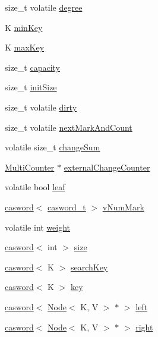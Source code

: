 \begin{DoxyCompactItemize}
\begin{tabbing}
\end{tabbing}\item 
size\+\_\+t volatile \hyperlink{classNode_a2dd213b9ec29f7a388aecbf3745028ab}{degree}
\item 
K \hyperlink{classNode_af389a346229e7fc7a55c07ce18816c72}{min\+Key}
\item 
K \hyperlink{classNode_a952ab64410cb2844499a2cf856848f14}{max\+Key}
\item 
size\+\_\+t \hyperlink{classNode_a017fd2017e14882deaf39b960d740b7e}{capacity}
\item 
size\+\_\+t \hyperlink{classNode_aba5197eb2b00bef6628dcf30056a2d92}{init\+Size}
\item 
size\+\_\+t volatile \hyperlink{classNode_af8f8003d96ba90f4f5acd5c003386b08}{dirty}
\item 
size\+\_\+t volatile \hyperlink{classNode_a8a7ef9d231138ce3458e3b360c0cee57}{next\+Mark\+And\+Count}
\item 
volatile size\+\_\+t \hyperlink{classNode_af94bd72d91f93e528c76778a60f5312e}{change\+Sum}
\item 
\hyperlink{classMultiCounter}{Multi\+Counter} $\ast$ \hyperlink{classNode_a5de4abf9942c16e6d8938e78a69efb31}{external\+Change\+Counter}
\item 
volatile bool \hyperlink{classNode_a1897c0740278b98f1066d2f62f29e6f4}{leaf}
\item 
\hyperlink{structcasword}{casword}$<$ \hyperlink{rq__unsafe_8h_ad45142aaf2ff20a036dc6242b8483e9c}{casword\+\_\+t} $>$ \hyperlink{classNode_a0aaf5a1dde5a35ada56cbd256639d894}{v\+Num\+Mark}
\item 
volatile int \hyperlink{classNode_a1c307fd773eae7760993981655620539}{weight}
\item 
\hyperlink{structcasword}{casword}$<$ int $>$ \hyperlink{classNode_a65f7073a99f7d2b7ee735cd548bd6f9b}{size}
\item 
\hyperlink{structcasword}{casword}$<$ K $>$ \hyperlink{classNode_a788327695ace7c76fd69877322f57b4e}{search\+Key}
\item 
\hyperlink{structcasword}{casword}$<$ K $>$ \hyperlink{classNode_ad0930076f2ac755390423b48c6856cfa}{key}
\item 
\hyperlink{structcasword}{casword}$<$ \hyperlink{classNode}{Node}$<$ K, V $>$ $\ast$ $>$ \hyperlink{classNode_ad94b2acd7430ef8a2ef4a197f4466c64}{left}
\item 
\hyperlink{structcasword}{casword}$<$ \hyperlink{classNode}{Node}$<$ K, V $>$ $\ast$ $>$ \hyperlink{classNode_afa1cf8bdbcc54a575704def2de4ab22f}{right}

\end{DoxyCompactItemize}
